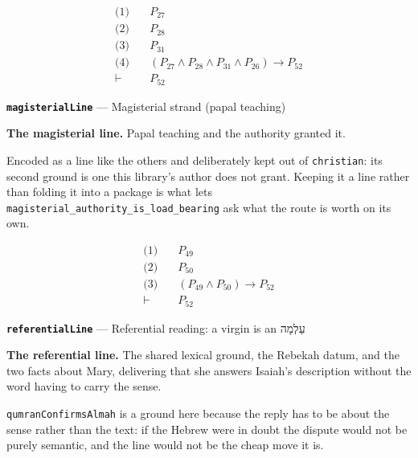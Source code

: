 \documentclass[11pt]{article}
\begin{document}
\begin{align*}
  \text{(1)} \quad & P_{27} \\
  \text{(2)} \quad & P_{28} \\
  \text{(3)} \quad & P_{31} \\
  \text{(4)} \quad & (P_{27} \land P_{28} \land P_{31} \land P_{26}) \rightarrow P_{52} \\
  \vdash \quad & P_{52}
\end{align*}
\par\medskip\noindent\textbf{\texttt{magisterial\allowbreak{}Line}} --- Magisterial strand (papal teaching)\par\nobreak\noindent
\textbf{The magisterial line.} Papal teaching and the authority granted it.

Encoded as a line like the others and deliberately kept out of \texttt{christian}: its second ground is one this library's author does not grant. Keeping it a line rather than folding it into a package is what lets \texttt{magisterial\_\allowbreak{}authority\_\allowbreak{}is\_\allowbreak{}load\_\allowbreak{}bearing} ask what the route is worth on its own.

\begin{align*}
  \text{(1)} \quad & P_{49} \\
  \text{(2)} \quad & P_{50} \\
  \text{(3)} \quad & (P_{49} \land P_{50}) \rightarrow P_{52} \\
  \vdash \quad & P_{52}
\end{align*}
\par\medskip\noindent\textbf{\texttt{referential\allowbreak{}Line}} --- Referential reading: a virgin is an עַלְמָה\par\nobreak\noindent
\textbf{The referential line.} The shared lexical ground, the Rebekah datum, and the two facts about Mary, delivering that she answers Isaiah's description without the word having to carry the sense.

\texttt{qumran\allowbreak{}Confirms\allowbreak{}Almah} is a ground here because the reply has to be about the sense rather than the text: if the Hebrew were in doubt the dispute would not be purely semantic, and the line would not be the cheap move it is.
\end{document}

